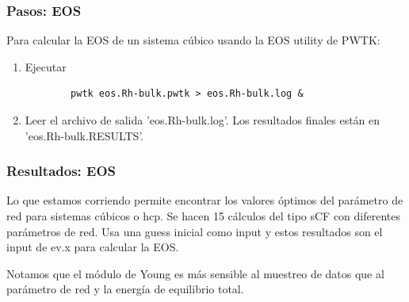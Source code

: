 \subsubsection{Pasos: EOS}

  Para calcular la EOS de un sistema cúbico usando la EOS utility de PWTK:

  \begin{enumerate}
    \item Ejecutar
      \begin{verbatim}
        pwtk eos.Rh-bulk.pwtk > eos.Rh-bulk.log &
      \end{verbatim}
    \item Leer el archivo de salida 'eos.Rh-bulk.log'. Los resultados finales están en 'eos.Rh-bulk.RESULTS'.
  \end{enumerate}

\subsubsection{Resultados: EOS}

  Lo que estamos corriendo permite encontrar los valores óptimos del parámetro de red para sistemas cúbicos o hcp. Se hacen 15 cálculos del tipo sCF con diferentes parámetros de red. Usa una guess inicial como input y estos resultados son el input de ev.x para calcular la EOS.

  Notamos que el módulo de Young es más sensible al muestreo de datos que al parámetro de red y la energía de equilibrio total.


